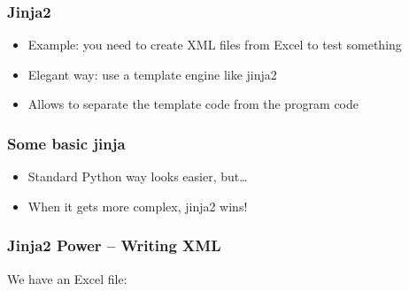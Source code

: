 \documentclass[english]{beamer}
\begin{document}
\begin{frame}
\frametitle{Jinja2}

\begin{itemize}
\item Example: you need to create XML files from Excel to test something
\item Elegant way: use a template engine like jinja2
\item Allows to separate the template code from the program code
\end{itemize}
\end{frame}

\begin{frame}[fragile]
\frametitle{Some basic jinja}




\begin{itemize}
	\item Standard Python way looks easier, but\ldots
	\item When it gets more complex, jinja2 wins!
\end{itemize}

\end{frame}

\begin{frame}[fragile]
\frametitle{Jinja2 Power -- Writing XML}

We have an Excel file:\vspace*{1em}



\end{frame}
\end{document}
